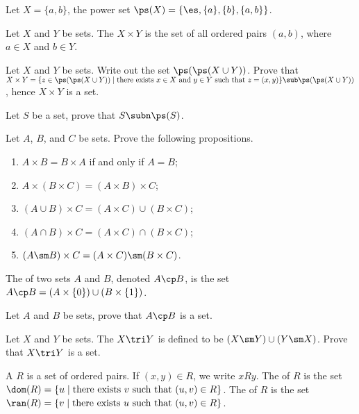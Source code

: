 \documentclass[10pt]{article}
\begin{document}
\begin{example}
    Let $X=\{a,b\}$, the power set $\ps(X)=\{\es,\{a\},\{b\},\{a,b\}\}$.
\end{example}
\begin{definition}
    Let $X$ and $Y$ be sets. The  $X\times Y$ is the set of all ordered pairs $(a,b)$, where $a\in X$ and $b\in Y$.
\end{definition}
\begin{problem}
    Let $X$ and $Y$ be sets. Write out the set $\ps(\ps(X\cup Y))$. Prove that $X\times Y=\{z\in\ps(\ps(X\cup Y))\mid\text{there exists}\ x\in X\ \text{and}\ y\in Y\ \text{such that}\ z=(x,y)\}\sub\ps(\ps(X\cup Y))$, hence $X\times Y$ is a set.
\end{problem}
\begin{problem}
    Let $S$ be a set, prove that $S\subn\ps(S)$. 
\end{problem}
\begin{problem}
    Let $A$, $B$, and $C$ be sets. Prove the following propositions.
    \begin{enumerate}
        \item $A\times B=B\times A$ if and only if $A=B$;
        \item $A\times(B\times C)=(A\times B)\times C$;
        \item $(A\cup B)\times C=(A\times C)\cup(B\times C)$;
        \item $(A\cap B)\times C=(A\times C)\cap(B\times C)$;
        \item $(A\sm B)\times C=(A\times C)\sm(B\times C)$.
    \end{enumerate}
\end{problem}
\begin{definition}
    The  of two sets $A$ and $B$, denoted $A\cp B$, is the set $A\cp B=(A\times\{0\})\cup(B\times\{1\})$.
\end{definition}
\begin{problem}
    Let $A$ and $B$ be sets, prove that $A\cp B$ is a set.
\end{problem}
\begin{problem}
    Let $X$ and $Y$ be sets. The  $X\tri Y$ is defined to be $(X\sm Y)\cup(Y\sm X)$. Prove that $X\tri Y$ is a set.
\end{problem}
\begin{definition}
    A  $R$ is a set of ordered pairs. If $(x,y)\in R$, we write $xRy$. The  of $R$ is the set $\dom(R)=\{u\mid\text{there exists}\ v\ \text{such that}\ (u,v)\in R\}$. The  of $R$ is the set $\ran(R)=\{v\mid\text{there exists}\ u\ \text{such that}\ (u,v)\in R\}$. 
\end{definition}
\end{document}

